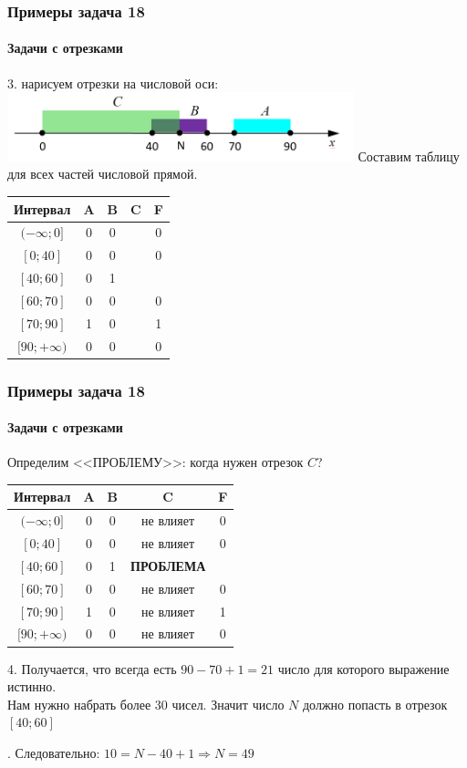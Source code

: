 \begin{frame}[t]
\frametitle{Примеры задача 18}
\framesubtitle{Задачи с отрезками}

	
	3. нарисуем отрезки на числовой оси:\\
	\includegraphics[height=2cm]{images/t18_1}
	\pause
	Составим таблицу для всех частей числовой прямой.
	\begin{tabular}{|c|c|c|c|c|}
\hline 
Интервал & A & B & C & F\tabularnewline
\hline 
$(-\infty;0]$ & 0 & 0 &  & 0\tabularnewline
\hline 
$[0;40]$ & 0 & 0 &  & 0\tabularnewline
\hline 
$[40;60]$ & 0 & 1 &  & \tabularnewline
\hline 
$[60;70]$ & 0 & 0 &  & 0\tabularnewline
\hline 
$[70;90]$ & 1 & 0 &  & 1\tabularnewline
\hline 
$[90;+\infty)$ & 0 & 0 &  & 0\tabularnewline
\hline 
\end{tabular}

	
	


\end{frame}

\begin{frame}[t]
\frametitle{Примеры задача 18}
\framesubtitle{Задачи с отрезками}

	
	Определим <<ПРОБЛЕМУ>>: когда нужен отрезок $C$?
	\begin{tabular}{|c|c|c|c|c|}
\hline 
Интервал & A & B & C & F\tabularnewline
\hline 
$(-\infty;0]$ & 0 & 0 & не влияет & 0\tabularnewline
\hline 
$[0;40]$ & 0 & 0 & не влияет & 0\tabularnewline
\hline 
$[40;60]$ & 0 & 1 & \textbf{ПРОБЛЕМА} & \tabularnewline
\hline 
$[60;70]$ & 0 & 0 & не влияет & 0\tabularnewline
\hline 
$[70;90]$ & 1 & 0 & не влияет & 1\tabularnewline
\hline 
$[90;+\infty)$ & 0 & 0 & не влияет & 0\tabularnewline
\hline 
\end{tabular}

	\pause
	
	4. Получается, что всегда есть $90-70+1=21$ число для которого выражение истинно.\\
	Нам нужно набрать более 30 чисел. Значит число $N$ должно попасть в отрезок $[40;60]$
	
	. Следовательно:  $10=N-40+1 \Rightarrow N=49$
	


\end{frame}

